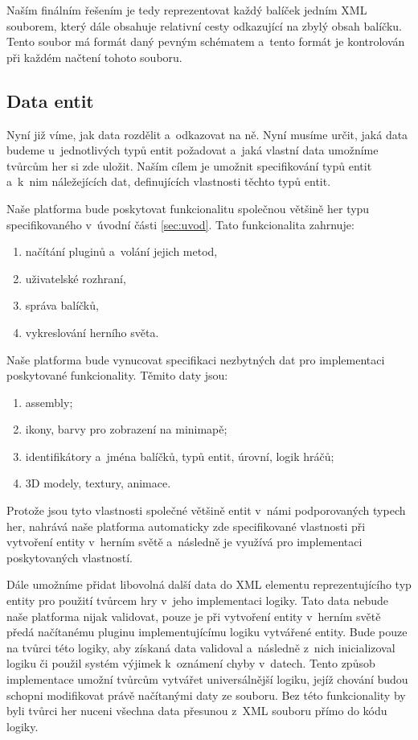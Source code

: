 Naším finálním řešením je tedy reprezentovat každý balíček jedním XML souborem, který dále obsahuje relativní cesty odkazující na zbylý obsah balíčku. Tento soubor má formát daný pevným schématem a~tento formát je kontrolován při každém načtení tohoto souboru. 

\subsection{Data entit}
Nyní již víme, jak data rozdělit a~odkazovat na ně. Nyní musíme určit, jaká data budeme u~jednotlivých typů entit požadovat a~jaká vlastní data umožníme tvůrcům her si zde uložit. Naším cílem je umožnit specifikování typů entit a~k~nim náležejících dat, definujících vlastnosti těchto typů entit. 

Naše platforma bude poskytovat funkcionalitu společnou většině her typu specifikovaného v~úvodní části \ref{sec:uvod}. 
Tato funkcionalita zahrnuje:
\begin{enumerate}
	\item načítání pluginů a~volání jejich metod,
	\item uživatelské rozhraní,
	\item správa balíčků,
	\item vykreslování herního světa.
\end{enumerate} 

Naše platforma bude vynucovat specifikaci nezbytných dat pro implementaci poskytované funkcionality. Těmito daty jsou:
\begin{enumerate}
	\item assembly;
	\item ikony, barvy pro zobrazení na minimapě;
	\item identifikátory a~jména balíčků, typů entit, úrovní, logik hráčů;
	\item 3D modely, textury, animace.
\end{enumerate}
Protože jsou tyto vlastnosti společné většině entit v~námi podporovaných typech her, nahrává naše platforma automaticky zde specifikované vlastnosti při vytvoření entity v~herním světě a~následně je využívá pro implementaci poskytovaných vlastností.

Dále umožníme přidat libovolná další data do XML elementu reprezentujícího typ entity pro použití tvůrcem hry v~jeho implementaci logiky. Tato data nebude naše platforma nijak validovat, pouze je při vytvoření entity v~herním světě předá načítanému pluginu implementujícímu logiku vytvářené entity. Bude pouze na tvůrci této logiky, aby získaná data validoval a~následně z~nich inicializoval logiku či použil systém výjimek k~oznámení chyby v~datech. Tento způsob implementace umožní tvůrcům vytvářet universálnější logiku, jejíž chování budou schopni modifikovat právě načítanými daty ze souboru. Bez této funkcionality by byli tvůrci her nuceni všechna data přesunou z~XML souboru přímo do kódu logiky.

